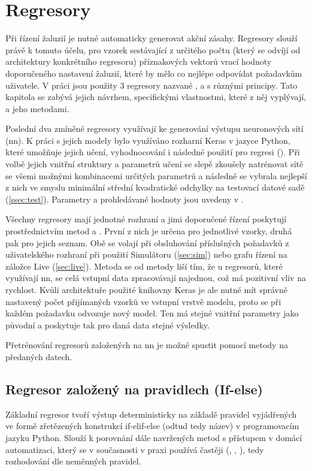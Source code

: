 \chapter{Regresory} \label{chap:regresory}
    Při řízení žaluzií je nutné automaticky generovat akční zásahy. Regresory slouží právě k tomuto účelu, pro vzorek sestávající z určitého počtu (který se odvíjí od architektury konkrétního regresoru) příznakových vektorů vrací hodnoty doporučeného nastavení žaluzií, které by mělo co nejlépe odpovídat požadavkům uživatele. V práci jsou použity 3 regresory nazvané ,  a  s různými principy. Tato kapitola se zabývá jejich návrhem, specifickými vlastnostmi, které z něj vyplývají, a jeho metodami.
    
    Poslední dva zmíněné regresory využívají ke generování výstupu neuronových sítí (\acrshort{nn}). K práci s jejich modely bylo využíváno rozharní Keras v jazyce Python, které umožňuje jejich učení, vyhodnocování i následné použití pro regresi (\cite{keras:doc}). Při volbě jejich vnitřní struktury a parametrů učení se slepě zkoušely natrénovat sítě se všemi možnými kombinacemi určitých parametrů a následně se vybrala nejlepší z nich ve smyslu minimální střední kvadratické odchylky na testovací datové sadě (\cref{ssec:test}). Parametry a prohledávané hodnoty jsou uvedeny v .

    Všechny regresory mají jednotné rozhraní a jimi doporučené řízení poskytují prostřednictvím metod  a . První z nich je určena pro jednotlivé vzorky, druhá pak pro jejich seznam. Obě se volají při obsluhování příslušných požadavků z uživatelského rozhraní při použití Simulátoru (\cref{sec:sim}) nebo grafu řízení na záložce Live (\cref{sec:live}). Metoda  se od metody  liší tím, že u regresorů, které využívají \acrshort{nn}, se celá vstupní data zpracovávají najednou, což má pozitivní vliv na rychlost. Kvůli architektuře použité knihovny Keras je ale nutné mít správně nastavený počet přijímaných vzorků ve vstupní vrstvě modelu, proto se při každém požadavku odvozuje nový model. Ten má stejné vnitřní parametry jako původní a poskytuje tak pro daná data stejné výsledky.
    
    Přetrénování regresorů založených na \acrshort{nn} je možné spustit pomocí metody  na předaných datech.
    \section{Regresor založený na pravidlech (If-else)}
        Základní regresor  tvoří výstup deterministicky na základě pravidel vyjádřených ve formě zřetězených konstrukcí if-elif-else (odtud tedy název) v programovacím jazyku Python. Slouží k porovnání dále navržených metod s přístupem v domácí automatizaci, který se v současnosti v praxi používá častěji (\cite{apple:home}, \cite{openhab:openhab}, \cite{hass:hass}), tedy rozhodování dle neměnných pravidel.

